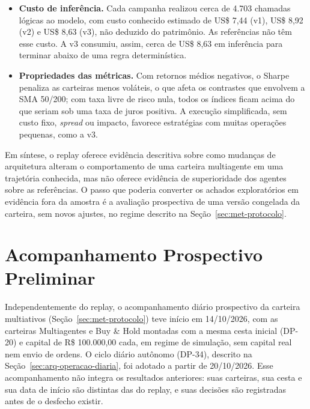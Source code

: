 \documentclass{eic-bcc-tcc}
\begin{document}
\begin{itemize}
    \item \textbf{Custo de inferência.} Cada campanha realizou cerca de 4.703 chamadas lógicas ao modelo, com custo conhecido estimado de US\$ 7,44 (v1), US\$ 8,92 (v2) e US\$ 8,63 (v3), não deduzido do patrimônio. As referências não têm esse custo. A v3 consumiu, assim, cerca de US\$ 8,63 em inferência para terminar abaixo de uma regra determinística.
    \item \textbf{Propriedades das métricas.} Com retornos médios negativos, o Sharpe penaliza as carteiras menos voláteis, o que afeta os contrastes que envolvem a SMA 50/200; com taxa livre de risco nula, todos os índices ficam acima do que seriam sob uma taxa de juros positiva. A execução simplificada, sem custo fixo, \textit{spread} ou impacto, favorece estratégias com muitas operações pequenas, como a v3.
\end{itemize}

Em síntese, o replay oferece evidência descritiva sobre como mudanças de arquitetura alteram o comportamento de uma carteira multiagente em uma trajetória conhecida, mas não oferece evidência de superioridade dos agentes sobre as referências. O passo que poderia converter os achados exploratórios em evidência fora da amostra é a avaliação prospectiva de uma versão congelada da carteira, sem novos ajustes, no regime descrito na Seção~\ref{sec:met-protocolo}.

\section{Acompanhamento Prospectivo Preliminar}
\label{sec:obs-operacional}

Independentemente do replay, o acompanhamento diário prospectivo da carteira multiativos (Seção~\ref{sec:met-protocolo}) teve início em 14/10/2026, com as carteiras Multiagentes e Buy \& Hold montadas com a mesma cesta inicial (DP-20) e capital de R\$ 100.000,00 cada, em regime de simulação, sem capital real nem envio de ordens. O ciclo diário autônomo (DP-34), descrito na Seção~\ref{sec:arq-operacao-diaria}, foi adotado a partir de 20/10/2026. Esse acompanhamento não integra os resultados anteriores: suas carteiras, sua cesta e sua data de início são distintas das do replay, e suas decisões são registradas antes de o desfecho existir.
\end{document}
